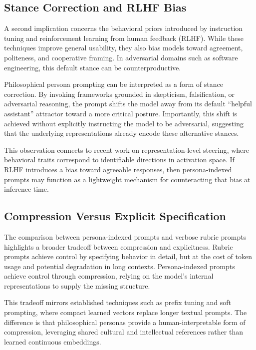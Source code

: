 \documentclass[11pt]{article}
\begin{document}
\subsection{Stance Correction and RLHF Bias}

A second implication concerns the behavioral priors introduced by instruction tuning and reinforcement learning from human feedback (RLHF). While these techniques improve general usability, they also bias models toward agreement, politeness, and cooperative framing. In adversarial domains such as software engineering, this default stance can be counterproductive.

Philosophical persona prompting can be interpreted as a form of stance correction. By invoking frameworks grounded in skepticism, falsification, or adversarial reasoning, the prompt shifts the model away from its default “helpful assistant” attractor toward a more critical posture. Importantly, this shift is achieved without explicitly instructing the model to be adversarial, suggesting that the underlying representations already encode these alternative stances.

This observation connects to recent work on representation-level steering, where behavioral traits correspond to identifiable directions in activation space. If RLHF introduces a bias toward agreeable responses, then persona-indexed prompts may function as a lightweight mechanism for counteracting that bias at inference time.

\subsection{Compression Versus Explicit Specification}

The comparison between persona-indexed prompts and verbose rubric prompts highlights a broader tradeoff between compression and explicitness. Rubric prompts achieve control by specifying behavior in detail, but at the cost of token usage and potential degradation in long contexts. Persona-indexed prompts achieve control through compression, relying on the model’s internal representations to supply the missing structure.

This tradeoff mirrors established techniques such as prefix tuning and soft prompting, where compact learned vectors replace longer textual prompts. The difference is that philosophical personas provide a human-interpretable form of compression, leveraging shared cultural and intellectual references rather than learned continuous embeddings.
\end{document}
